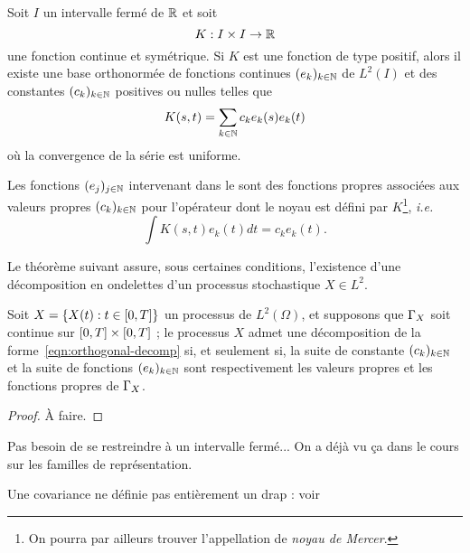 \begin{theoreme}
  \label{thm:mercers-theorem}
  Soit $I$ un intervalle fermé de $\mathbb{R}$ et soit
  \[ K : I\times I\to \mathbb{R} \] une fonction continue et symétrique. Si
  $K$ est une fonction de type positif, alors il existe une base
  orthonormée de fonctions continues $(e_k)_{k\in\mathbb{N}}$ de $L^2(I)$ et
  des constantes $(c_k)_{k\in\mathbb{N}}$ positives ou nulles telles que
  \begin{equation}
    K(s,t) = \sum_{k\in\mathbb{N}} c_k e_k(s) e_k(t)
  \end{equation}
  où la convergence de la série est uniforme.
\end{theoreme}

\begin{remarque}
  Les fonctions $(e_j)_{j\in\mathbb{N}}$ intervenant dans le
   sont des \og fonctions propres\fg{}
  associées aux \og valeurs propres\fg{} $(c_k)_{k\in\mathbb{N}}$ pour
  l'opérateur dont le noyau est défini par $K$\footnote{On pourra par
    ailleurs trouver l'appellation de \emph{noyau de Mercer}.},
  \emph{i.e.}
  \begin{equation*}
    \int K(s,t) e_k(t) dt = c_k e_k(t).
  \end{equation*}
\end{remarque}

Le théorème suivant assure, sous certaines conditions, l'existence
d'une \og décomposition en ondelettes\fg{} d'un processus stochastique
$X\in L^2$.

\begin{theoreme}
  \label{thm:orthogonal-decomp}
  Soit $X = \{X(t) : t\in\left[0,T\right]\}$ un processus de $L^2(\Omega)$,
  et supposons que $\Gamma_X$ soit continue sur
  $\left[0,T\right]\times\left[0,T\right]$ ; le processus $X$ admet une
  décomposition de la forme~\ref{eqn:orthogonal-decomp} si, et
  seulement si, la suite de constante $(c_k)_{k\in\mathbb{N}}$ et la suite de
  fonctions $(e_k)_{k\in\mathbb{N}}$ sont respectivement les valeurs propres
  et les fonctions propres de $\Gamma_X$.
\end{theoreme}
\begin{alert}
  \begin{proof}
    À faire.
  \end{proof}
\end{alert}

\begin{alert}
  Pas besoin de se restreindre à un intervalle fermé... On a déjà vu
  ça dans le cours sur les familles de représentation.

  Une covariance ne définie pas entièrement un drap : voir~\cite{herbin2002}
\end{alert}

